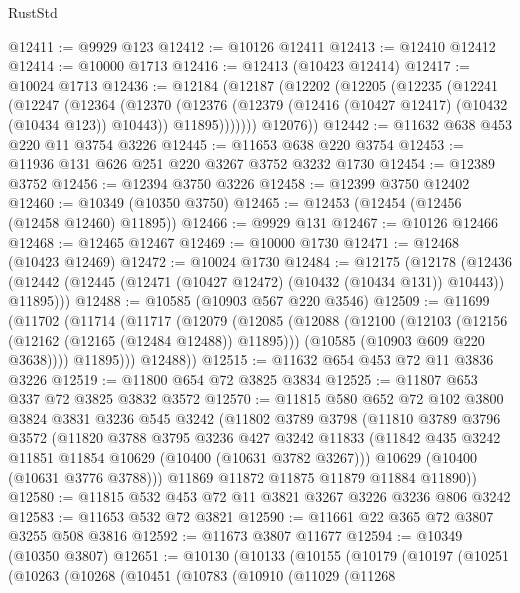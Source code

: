 \begin{lexlean}{RustStd}
\begin{coremodule}
@12411 := @9929 @123
@12412 := @10126 @12411
@12413 := @12410 @12412
@12414 := @10000 @1713
@12416 := @12413 (@10423 @12414)
@12417 := @10024 @1713
@12436 := @12184
    (@12187
      (@12202
        (@12205
          (@12235
            (@12241
              (@12247
                (@12364
                  (@12370
                    (@12376
                      (@12379 (@12416 (@10427 @12417) (@10432 (@10434 @123)) @10443))
                      @11895)))))))
        @12076))
@12442 := @11632 @638 @453 @220 @11 @3754 @3226
@12445 := @11653 @638 @220 @3754
@12453 := @11936 @131 @626 @251 @220 @3267 @3752 @3232 @1730
@12454 := @12389 @3752
@12456 := @12394 @3750 @3226
@12458 := @12399 @3750 @12402
@12460 := @10349 (@10350 @3750)
@12465 := @12453 (@12454 (@12456 (@12458 @12460) @11895))
@12466 := @9929 @131
@12467 := @10126 @12466
@12468 := @12465 @12467
@12469 := @10000 @1730
@12471 := @12468 (@10423 @12469)
@12472 := @10024 @1730
@12484 := @12175
    (@12178
      (@12436 (@12442 (@12445 (@12471 (@10427 @12472) (@10432 (@10434 @131)) @10443)) @11895)))
@12488 := @10585 (@10903 @567 @220 @3546)
@12509 := @11699
    (@11702
      (@11714
        (@11717
          (@12079
            (@12085
              (@12088
                (@12100
                  (@12103 (@12156 (@12162 (@12165 (@12484 @12488)) @11895)))
                  (@10585 (@10903 @609 @220 @3638))))
              @11895)))
        @12488))
@12515 := @11632 @654 @453 @72 @11 @3836 @3226
@12519 := @11800 @654 @72 @3825 @3834
@12525 := @11807 @653 @337 @72 @3825 @3832 @3572
@12570 := @11815
    @580
    @652
    @72
    @102
    @3800
    @3824
    @3831
    @3236
    @545
    @3242
    (@11802
      @3789
      @3798
      (@11810
        @3789
        @3796
        @3572
        (@11820
          @3788
          @3795
          @3236
          @427
          @3242
          @11833
          (@11842 @435 @3242 @11851 @11854 @10629 (@10400 (@10631 @3782 @3267)))
          @10629
          (@10400 (@10631 @3776 @3788)))
        @11869
        @11872
        @11875
        @11879
        @11884
        @11890))
@12580 := @11815 @532 @453 @72 @11 @3821 @3267 @3226 @3236 @806 @3242
@12583 := @11653 @532 @72 @3821
@12590 := @11661 @22 @365 @72 @3807 @3255 @508 @3816
@12592 := @11673 @3807 @11677
@12594 := @10349 (@10350 @3807)
@12651 := @10130
    (@10133
      (@10155
        (@10179
          (@10197
            (@10251
              (@10263
                (@10268
                  (@10451
                    (@10783
                      (@10910
                        (@11029
                          (@11268

\end{coremodule}
\end{lexlean}
